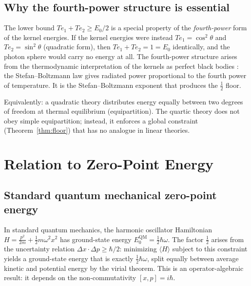 \documentclass[%
 reprint, amsmath,amssymb, aps, prb, ]{revtex4-2}
\numberwithin{equation}{section}
\begin{document}
\subsection{Why the fourth-power structure is essential}

The lower bound $Te_1 + Te_2 \geq E_0/2$ is a special property of the \emph{fourth-power} form of the kernel energies. If the kernel energies were instead $Te_1 = \cos^2\theta$ and $Te_2 = \sin^2\theta$ (quadratic form), then $Te_1 + Te_2 = 1 = E_0$ identically, and the photon sphere would carry no energy at all. The fourth-power structure arises from the thermodynamic interpretation of the kernels as perfect black bodies \cite{hanamura2018}: the Stefan--Boltzmann law gives radiated power proportional to the fourth power of temperature. It is the Stefan--Boltzmann exponent that produces the $\tfrac{1}{2}$ floor.

Equivalently: a quadratic theory distributes energy equally between two degrees of freedom at thermal equilibrium (equipartition). The quartic theory does not obey simple equipartition; instead, it enforces a global constraint (Theorem~\ref{thm:floor}) that has no analogue in linear theories.

\section{Relation to Zero-Point Energy}
\label{sec:zpe}

\subsection{Standard quantum mechanical zero-point energy}

In standard quantum mechanics, the harmonic oscillator Hamiltonian $H = \tfrac{p^2}{2m} + \tfrac{1}{2}m\omega^2 x^2$ has ground-state energy $E_0^\text{QM} = \tfrac{1}{2}\hbar\omega$. The factor $\tfrac{1}{2}$ arises from the uncertainty relation $\Delta x \cdot \Delta p \geq \hbar/2$: minimizing $\langle H \rangle$ subject to this constraint yields a ground-state energy that is exactly $\tfrac{1}{2}\hbar\omega$, split equally between average kinetic and potential energy by the virial theorem. This is an operator-algebraic result: it depends on the non-commutativity $[x, p] = i\hbar$.
\end{document}
